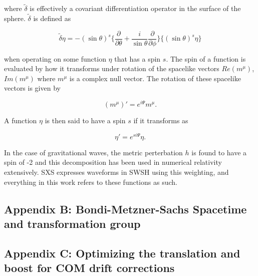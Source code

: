 \documentclass{article}
\begin{document}
where $\tilde{\delta}$ is effectively a covariant differentiation operator in the surface of the sphere. $\tilde{\delta}$ is defined \cite{ENRP66} as

\begin{equation}
\tilde{\delta} \eta = -(\sin\theta)^s \Big\{ \frac{\partial}{\partial \theta} + \frac{i}{\sin \theta} \frac{\partial}{\partial \phi}\Big\} \big\{ (\sin \theta)^s \eta \big\}
\end{equation} 

when operating on some function $\eta$ that has a spin $s$. The spin of a function is evaluated by how it transforms under rotation of the spacelike vectors $Re (m^\mu)$, $Im(m^\mu)$ where $m^\mu$ is a complex null vector. The rotation of these spacelike vectors is given by

\begin{equation}
(m^\mu)' = e^{i \Psi} m^\mu .
\end{equation}

A function $\eta$ is then said to have a spin $s$ if it transforms as

\begin{equation}
\eta' = e^{s i \Psi}\eta.
\end{equation}

In the case of gravitational waves, the metric perterbation $h$ is found to have a spin of -2 \cite{ENRP66,PA11} and this decomposition has been used in numerical relativity extensively. SXS expresses waveforms in SWSH using this weighting, and everything in this work refers to these functions as such.

\subsection{Appendix B: Bondi-Metzner-Sachs Spacetime and transformation group}


\subsection{Appendix C: Optimizing the translation and boost for COM drift corrections}



\end{document}
